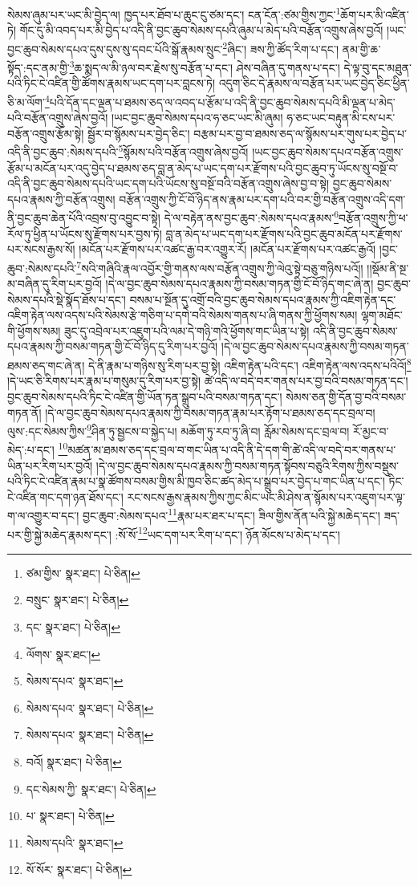 སེམས་ཞུམ་པར་ཡང་མི་བྱེད་ལ། ཁྱད་པར་ཐོབ་པ་ཆུང་ངུ་ཙམ་དང་། ངན་ངོན་:ཙམ་གྱིས་ཀྱང་\footnote{ཙམ་གྱིས་  སྣར་ཐང་།  པེ་ཅིན། }ཆོག་པར་མི་འཛིན་ཏེ། གོང་དུ་མི་འབད་པར་མི་བྱེད་པ་འདི་ནི་བྱང་ཆུབ་སེམས་དཔའི་ཞུམ་པ་མེད་པའི་བརྩོན་འགྲུས་ཞེས་བྱའོ། །ཡང་བྱང་ཆུབ་སེམས་དཔའ་དུས་དུས་སུ་དབང་པོའི་སྒོ་རྣམས་སྲུང་\footnote{བསྲུང་  སྣར་ཐང་།  པེ་ཅིན། }ཞིང་། ཟས་ཀྱི་ཚོད་རིག་པ་དང་། ནམ་གྱི་ཆ་སྟོད་:དང་ནམ་གྱི་\footnote{དང་  སྣར་ཐང་།  པེ་ཅིན། }ཆ་སྨད་ལ་མི་ཉལ་བར་རྗེས་སུ་བརྩོན་པ་དང་། ཤེས་བཞིན་དུ་གནས་པ་དང་། དེ་ལྟ་བུ་དང་མཐུན་པའི་ཏིང་ངེ་འཛིན་གྱི་ཚོགས་རྣམས་ཡང་དག་པར་བླངས་ཏེ། འདུག་ཅིང་དེ་རྣམས་ལ་བརྩོན་པར་ཡང་བྱེད་ཅིང་ཕྱིན་ཅི་མ་ལོག་\footnote{ལོགས་  སྣར་ཐང་། }པའི་དོན་དང་ལྡན་པ་ཐམས་ཅད་ལ་འབད་པ་རྩོམ་པ་འདི་ནི་བྱང་ཆུབ་སེམས་དཔའི་མི་ལྡན་པ་མེད་པའི་བརྩོན་འགྲུས་ཞེས་བྱའོ། །ཡང་བྱང་ཆུབ་སེམས་དཔའ་ཧ་ཅང་ཡང་མི་ཞུམ། ཧ་ཅང་ཡང་བརྟུན་མི་ངས་པར་བརྩོན་འགྲུས་རྩོམ་སྟེ། སྦྱོར་བ་སྙོམས་པར་བྱེད་ཅིང་། བརྩམ་པར་བྱ་བ་ཐམས་ཅད་ལ་སྙོམས་པར་གུས་པར་བྱེད་པ་འདི་ནི་བྱང་ཆུབ་:སེམས་དཔའི་\footnote{སེམས་དཔའ་  སྣར་ཐང་། }སྙོམས་པའི་བརྩོན་འགྲུས་ཞེས་བྱའོ། །ཡང་བྱང་ཆུབ་སེམས་དཔའ་བརྩོན་འགྲུས་རྩོམ་པ་མངོན་པར་འདུ་བྱེད་པ་ཐམས་ཅད་བླ་ན་མེད་པ་ཡང་དག་པར་རྫོགས་པའི་བྱང་ཆུབ་ཏུ་ཡོངས་སུ་བསྔོ་བ་འདི་ནི་བྱང་ཆུབ་སེམས་དཔའི་ཡང་དག་པའི་ཡོངས་སུ་བསྔོ་བའི་བརྩོན་འགྲུས་ཞེས་བྱ་བ་སྟེ། བྱང་ཆུབ་སེམས་དཔའ་རྣམས་ཀྱི་བརྩོན་འགྲུས། བརྩོན་འགྲུས་ཀྱི་ངོ་བོ་ཉིད་ནས་རྣམ་པར་དག་པའི་བར་གྱི་བརྩོན་འགྲུས་འདི་དག་ནི་བྱང་ཆུབ་ཆེན་པོའི་འབྲས་བུ་འབྱུང་བ་སྟེ། དེ་ལ་བརྟེན་ནས་བྱང་ཆུབ་:སེམས་དཔའ་རྣམས་\footnote{སེམས་དཔའ་  སྣར་ཐང་།  པེ་ཅིན། }བརྩོན་འགྲུས་ཀྱི་ཕ་རོལ་ཏུ་ཕྱིན་པ་ཡོངས་སུ་རྫོགས་པར་བྱས་ཏེ། བླ་ན་མེད་པ་ཡང་དག་པར་རྫོགས་པའི་བྱང་ཆུབ་མངོན་པར་རྫོགས་པར་སངས་རྒྱས་སོ། །མངོན་པར་རྫོགས་པར་འཚང་རྒྱ་བར་འགྱུར་རོ། །མངོན་པར་རྫོགས་པར་འཚང་རྒྱའོ། །བྱང་ཆུབ་:སེམས་དཔའི་\footnote{སེམས་དཔའ་  སྣར་ཐང་།  པེ་ཅིན། }སའི་གཞིའི་རྣལ་འབྱོར་གྱི་གནས་ལས་བརྩོན་འགྲུས་ཀྱི་ལེའུ་སྟེ་བཅུ་གཉིས་པའོ།། །།སྡོམ་ནི་སྔ་མ་བཞིན་དུ་རིག་པར་བྱའོ། །དེ་ལ་བྱང་ཆུབ་སེམས་དཔའ་རྣམས་ཀྱི་བསམ་གཏན་གྱི་ངོ་བོ་ཉིད་གང་ཞེ་ན། བྱང་ཆུབ་སེམས་དཔའི་སྡེ་སྣོད་ཐོས་པ་དང་། བསམ་པ་སྔོན་དུ་འགྲོ་བའི་བྱང་ཆུབ་སེམས་དཔའ་རྣམས་ཀྱི་འཇིག་རྟེན་དང་འཇིག་རྟེན་ལས་འདས་པའི་སེམས་རྩེ་གཅིག་པ་དགེ་བའི་སེམས་གནས་པ་ཞི་གནས་ཀྱི་ཕྱོགས་སམ། ལྷག་མཐོང་གི་ཕྱོགས་སམ། ཟུང་དུ་འབྲེལ་པར་འཇུག་པའི་ལམ་དེ་གཉི་གའི་ཕྱོགས་གང་ཡིན་པ་སྟེ། འདི་ནི་བྱང་ཆུབ་སེམས་དཔའ་རྣམས་ཀྱི་བསམ་གཏན་གྱི་ངོ་བོ་ཉིད་དུ་རིག་པར་བྱའོ། །དེ་ལ་བྱང་ཆུབ་སེམས་དཔའ་རྣམས་ཀྱི་བསམ་གཏན་ཐམས་ཅད་གང་ཞེ་ན། དེ་ནི་རྣམ་པ་གཉིས་སུ་རིག་པར་བྱ་སྟེ། འཇིག་རྟེན་པའི་དང་། འཇིག་རྟེན་ལས་འདས་པའིའོ།\footnote{བའོ།  སྣར་ཐང་།  པེ་ཅིན། } །དེ་ཡང་ཅི་རིགས་པར་རྣམ་པ་གསུམ་དུ་རིག་པར་བྱ་སྟེ། ཚེ་འདི་ལ་བདེ་བར་གནས་པར་བྱ་བའི་བསམ་གཏན་དང་། བྱང་ཆུབ་སེམས་དཔའི་ཏིང་ངེ་འཛིན་གྱི་ཡོན་ཏན་སྒྲུབ་པའི་བསམ་གཏན་དང་། སེམས་ཅན་གྱི་དོན་བྱ་བའི་བསམ་གཏན་ནོ། །དེ་ལ་བྱང་ཆུབ་སེམས་དཔའ་རྣམས་ཀྱི་བསམ་གཏན་རྣམ་པར་རྟོག་པ་ཐམས་ཅད་དང་བྲལ་བ། ལུས་:དང་སེམས་ཀྱིས་\footnote{དང་སེམས་ཀྱི་  སྣར་ཐང་།  པེ་ཅིན། }ཤིན་ཏུ་སྦྱངས་བ་སྐྱེད་པ། མཆོག་ཏུ་རབ་ཏུ་ཞི་བ། རློམ་སེམས་དང་བྲལ་བ། རོ་མྱང་བ་མེད་:པ་དང་། \footnote{པ་  སྣར་ཐང་།  པེ་ཅིན། }མཚན་མ་ཐམས་ཅད་དང་བྲལ་བ་གང་ཡིན་པ་འདི་ནི་དེ་དག་གི་ཚེ་འདི་ལ་བདེ་བར་གནས་པ་ཡིན་པར་རིག་པར་བྱའོ། །དེ་ལ་བྱང་ཆུབ་སེམས་དཔའ་རྣམས་ཀྱི་བསམ་གཏན་སྟོབས་བཅུའི་རིགས་ཀྱིས་བསྡུས་པའི་ཏིང་ངེ་འཛིན་རྣམ་པ་སྣ་ཚོགས་བསམ་གྱིས་མི་ཁྱབ་ཅིང་ཚད་མེད་པ་སྒྲུབ་པར་བྱེད་པ་གང་ཡིན་པ་དང་། ཏིང་ངེ་འཛིན་གང་དག་ཉན་ཐོས་དང་། རང་སངས་རྒྱས་རྣམས་ཀྱིས་ཀྱང་མིང་ཡང་མི་ཤེས་ན་སྙོམས་པར་འཇུག་པར་ལྟ་ག་ལ་འགྱུར་བ་དང་། བྱང་ཆུབ་:སེམས་དཔའ་\footnote{སེམས་དཔའི་  སྣར་ཐང་། }རྣམ་པར་ཐར་པ་དང་། ཟིལ་གྱིས་ནོན་པའི་སྐྱེ་མཆེད་དང་། ཟད་པར་གྱི་སྐྱེ་མཆེད་རྣམས་དང་། :སོ་སོ་\footnote{སོ་སོར་  སྣར་ཐང་།  པེ་ཅིན། }ཡང་དག་པར་རིག་པ་དང་། ཉོན་མོངས་པ་མེད་པ་དང་། 
